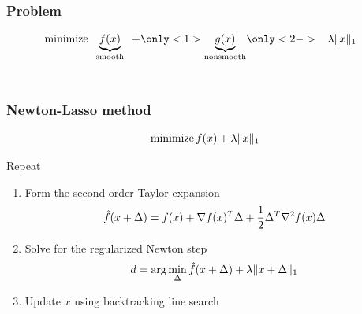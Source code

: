 \documentclass{beamer}
\author{Paul Tseng and Sangwoon Yun, 2009 \\ Presented by Matt Wytock \\ MLD Journal Club}
\begin{document}
\maketitle

\begin{frame}[t]
\frametitle{Problem}
\vspace{0.6in}
\[
\minimize \;\; \underbrace{f(x)}_\text{smooth} \;\; +
\only<1>{\underbrace{g(x)}_\text{nonsmooth}}
\only<2->{\;\;\; \lambda \|x\|_1 \;\;\;}
\] \\
\vspace{0.5in}
\end{frame}

\begin{frame}
\frametitle{Newton-Lasso method}
\[\operatorname*{minimize} f(x) + \lambda \|x\|_1
\]
\pause

Repeat
\begin{enumerate}
\item Form the second-order Taylor expansion
  \[
  \vspace{-0.3in}
  \hat{f}(x + \Delta) = f(x) + \nabla f(x)^T\Delta +
  \frac{1}{2}\Delta^T\nabla^2f(x)\Delta
  \]
\pause
\item Solve for the regularized Newton step
  \[
  \vspace{-0.3in}
  d = \arg \min_\Delta \hat{f}(x + \Delta) + \lambda\|x + \Delta \|_1
  \]
\pause
\item Update $x$ using backtracking line search
\end{enumerate}
\end{frame}
\end{document}
